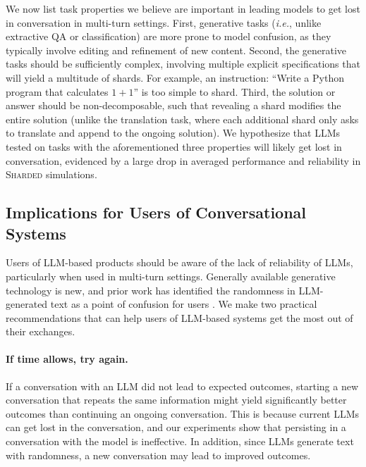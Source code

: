\documentclass{article}
\newcommand{\shardedt}{\textsc{Sharded}\xspace}
\begin{document}
We now list task properties we believe are important in leading models to get lost in conversation in multi-turn settings. First, generative tasks (\textit{i.e.}, unlike extractive QA or classification) are more prone to model confusion, as they typically involve editing and refinement of new content. Second, the generative tasks should be sufficiently complex, involving multiple explicit specifications that will yield a multitude of shards. For example, an instruction: ``Write a Python program that calculates $1+1$'' is too simple to shard. Third, the solution or answer should be non-decomposable, such that revealing a shard modifies the entire solution (unlike the translation task, where each additional shard only asks to translate and append to the ongoing solution). We hypothesize that LLMs tested on tasks with the aforementioned three properties will likely get lost in conversation, evidenced by a large drop in averaged performance and reliability in \shardedt simulations.

\subsection{Implications for Users of Conversational Systems} \label{sec:implications_users}

Users of LLM-based products should be aware of the lack of reliability of LLMs, particularly when used in multi-turn settings. Generally available generative technology is new, and prior work has identified the randomness in LLM-generated text as a point of confusion for users \cite{Mylrea2023ArtificialI,Weisz2024DesignPF,venkit2024search,Lee2024OneVM}. We make two practical recommendations that can help users of LLM-based systems get the most out of their exchanges.

\paragraph{If time allows, try again.} If a conversation with an LLM did not lead to expected outcomes, starting a new conversation that repeats the same information might yield significantly better outcomes than continuing an ongoing conversation. This is because current LLMs can get lost in the conversation, and our experiments show that persisting in a conversation with the model is ineffective. In addition, since LLMs generate text with randomness, a new conversation may lead to improved outcomes.
\end{document}
